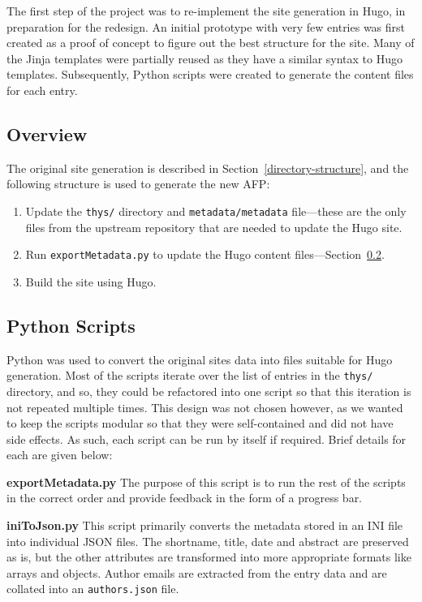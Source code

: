 \documentclass[bsc,frontabs,oneside,singlespacing,parskip,deptreport,logo]{infthesis}
\begin{document}
The first step of the project was to re-implement the site generation in Hugo, in preparation for the redesign. An initial prototype with very few entries was first created as a proof of concept to figure out the best structure for the site. Many of the Jinja templates were partially reused as they have a similar syntax to Hugo templates. Subsequently, Python scripts were created to generate the content files for each entry. 

\subsection{Overview}

The original site generation is described in Section~\ref{directory-structure}, and the following structure is used to generate the new AFP:

\begin{enumerate}
    \item Update the \texttt{thys/} directory and \texttt{metadata/metadata} file---these are the only files from the upstream repository that are needed to update the Hugo site.
    \item Run \texttt{exportMetadata.py} to update the Hugo content files---Section~\ref{python-scripts}.
    \item Build the site using Hugo.
\end{enumerate}

\subsection{Python Scripts} \label{python-scripts}

Python was used to convert the original sites data into files suitable for Hugo generation. Most of the scripts iterate over the list of entries in the \texttt{thys/} directory, and so, they could be refactored into one script so that this iteration is not repeated multiple times. This design was not chosen however, as we wanted to keep the scripts modular so that they were self-contained and did not have side effects. As such, each script can be run by itself if required. Brief details for each are given below:




\textbf{exportMetadata.py} The purpose of this script is to run the rest of the scripts in the correct order and provide feedback in the form of a progress bar.

\textbf{iniToJson.py} This script primarily converts the metadata stored in an INI file into individual JSON files. The shortname, title, date and abstract are preserved as is, but the other attributes are transformed into more appropriate formats like arrays and objects. Author emails are extracted from the entry data and are collated into an \texttt{authors.json} file. 
\end{document}
